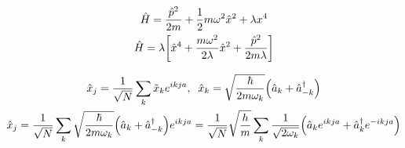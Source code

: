\documentclass{report}
\theoremstyle{definition}
\begin{document}
\begin{chapter2}\label{prob:2}
	\begin{gather*}
		\hat{H} = \frac{\hat{p}^2}{2m} + \frac{1}{2}m\omega^2\hat{x}^2 + \lambda x^4  \\
		\hat{H} = \lambda\bqty{\hat{x}^4 + \frac{m\omega^2}{2\lambda}\hat{x}^2 + \frac{\hat{p}^2}{2m\lambda}} \\
	\end{gather*}
\end{chapter2}

\begin{chapter2}\label{prob:3}
	\begin{gather*}
		\hat{x}_j = \frac{1}{\sqrt{N}}\sum_{k}\tilde{x}_k e^{ikja}, \;\; \hat{x}_k = \sqrt{\frac{\hbar}{2m\omega_k}}\pqty{\hat{a}_k + \hat{a}_{-k}^{\dagger}} \\
		\hat{x}_j = \frac{1}{\sqrt{N}}\sum_{k} \sqrt{\frac{\hbar}{2m\omega_k}}\pqty{\hat{a}_k + \hat{a}_{-k}^{\dagger}}e^{ikja} = \frac{1}{\sqrt{N}}\sqrt{\frac{h}{m}}\sum_{k}\frac{1}{\sqrt{2\omega_k}}\pqty{\hat{a}_k e^{ikja}+ \hat{a}_{k}^{\dagger}e^{-ikja}}
	\end{gather*}
\end{chapter2}
\end{document}
